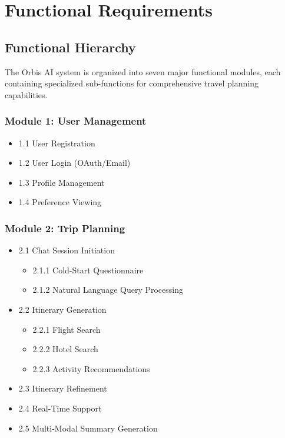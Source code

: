\documentclass[12pt,a4paper]{article}
\begin{document}
\section{Functional Requirements}

\subsection{Functional Hierarchy}

\begin{infobox}
The Orbis AI system is organized into seven major functional modules, each containing specialized sub-functions for comprehensive travel planning capabilities.
\end{infobox}

\subsubsection{Module 1: User Management}

\begin{itemize}[leftmargin=*, itemsep=0.2em]
    \item 1.1 User Registration
    \item 1.2 User Login (OAuth/Email)
    \item 1.3 Profile Management
    \item 1.4 Preference Viewing
\end{itemize}

\subsubsection{Module 2: Trip Planning}

\begin{itemize}[leftmargin=*, itemsep=0.2em]
    \item 2.1 Chat Session Initiation
    \begin{itemize}[leftmargin=1.5cm, itemsep=0.1em]
        \item 2.1.1 Cold-Start Questionnaire
        \item 2.1.2 Natural Language Query Processing
    \end{itemize}
    \item 2.2 Itinerary Generation
    \begin{itemize}[leftmargin=1.5cm, itemsep=0.1em]
        \item 2.2.1 Flight Search
        \item 2.2.2 Hotel Search
        \item 2.2.3 Activity Recommendations
    \end{itemize}
    \item 2.3 Itinerary Refinement
    \item 2.4 Real-Time Support
    \item 2.5 Multi-Modal Summary Generation
\end{itemize}
\end{document}
